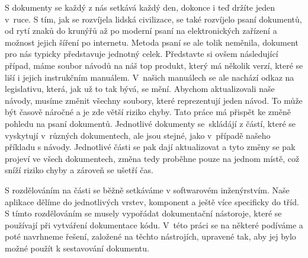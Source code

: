 S dokumenty se každý z nás setkává každý den, dokonce i teď držíte jeden v~ruce. S tím, jak se rozvíjela lidská civilizace,
se také rozvíjelo psaní dokumentů, od rytí znaků do krunýřů až po moderní psaní na elektronických zařízení a možnost jejich šíření po internetu.
Metoda psaní se ale tolik neměnila, dokument pro nás typicky představuje jednotný celek. Představte si ovšem \linebreak následující případ, máme soubor návodů na náš top
produkt, který má několik verzí, které se liší i jejich instrukčním manuálem. V~našich manuálech se ale nachází odkaz na legislativu, která, jak už to tak
bývá, se mění. Abychom aktualizovali naše návody, musíme změnit všechny soubory, které reprezentují jeden návod. To může být časově náročné a je zde větší riziko
chyby. Tato práce má přispět ke změně pohledu na psaní dokumentů. Jednotlivé dokumenty se~skládájí z částí, které se vyskytují v~různých dokumentech, ale jsou stejné,
jako v~případě našeho příkladu s návody. Jednotlivé části se pak dají aktualizovat a tyto změny se pak projeví ve všech dokumentech, změna tedy proběhne
pouze na jednom místě, což sníží riziko chyby a zároveň se ušetří čas.

S rozdělováním na části se běžně setkáváme v softwarovém inženýrstvím. Naše aplikace dělíme do jednotlivých vrstev, komponent a ještě více specificky do tříd.
S tímto rozdělováním se musely vypořádat dokumentační nástoroje, které se používají při vytváření dokumentace kódu. V~této práci se na některé podíváme a poté navrhneme řešení,
založené na těchto nástrojích, upravené tak, aby jej bylo možné použít k sestavování dokumentu.